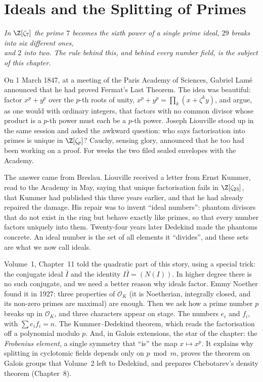 \chapter{Ideals and the Splitting of Primes}
\begin{center}\itshape
In $\Z[\zeta_7]$ the prime $7$ becomes the sixth power of a single prime ideal, $29$ breaks into six different ones,\\
and $2$ into two. The rule behind this, and behind every number field, is the subject of this chapter.
\end{center}

On 1 March 1847, at a meeting of the Paris Academy of Sciences, Gabriel Lamé announced that he had proved Fermat's Last
Theorem. The idea was beautiful: factor $x^p+y^p$ over the $p$-th roots of unity, $x^p+y^p=\prod_k(x+\zeta^ky)$, and argue,
as one would with ordinary integers, that factors with no common divisor whose product is a $p$-th power must each be a
$p$-th power. Joseph Liouville stood up in the same session and asked the awkward question: who says factorisation into
primes is unique in $\Z[\zeta_p]$? Cauchy, sensing glory, announced that he too had been working on a proof. For weeks the
two filed sealed envelopes with the Academy.

The answer came from Breslau. Liouville received a letter from Ernst Kummer, read to the Academy in May, saying that
unique factorisation fails in $\Z[\zeta_{23}]$, that Kummer had published this three years earlier, and that he had
already repaired the damage. His repair was to invent ``ideal numbers'': phantom divisors that do not exist in the ring
but behave exactly like primes, so that every number factors uniquely into them. Twenty-four years later Dedekind made the
phantoms concrete. An ideal number is the set of all elements it ``divides'', and these sets are what we now call
ideals.

Volume~1, Chapter~11 told the quadratic part of this story, using a special trick: the conjugate ideal $\bar I$ and the
identity $I\bar I=(N(I))$. In higher degree there is no such conjugate, and we need a better reason why ideals factor.
Emmy Noether found it in 1927: three properties of $\mathcal O_K$ (it is Noetherian, integrally closed, and its non-zero
primes are maximal) are enough. Then we ask how a prime number $p$ breaks up in $\mathcal O_K$, and three characters
appear on stage. The numbers $e_i$ and $f_i$, with $\sum e_if_i=n$. The Kummer--Dedekind theorem, which reads the
factorisation off a polynomial modulo $p$. And, in Galois extensions, the star of the chapter: the \emph{Frobenius
element}, a single symmetry that ``is'' the map $x\mapsto x^p$. It explains why splitting in cyclotomic fields depends only
on $p\bmod m$, proves the theorem on Galois groups that Volume~2 left to Dedekind, and prepares Chebotarev's density theorem
(Chapter~8).


